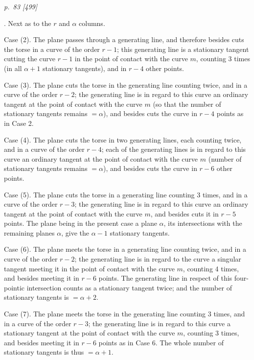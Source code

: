 \documentclass[11pt,a4paper]{article}
\newcommand{\pagemarker}[2]{\clearpage\noindent\textit{p.~#1 [#2]}\par\medskip}
\begin{document}
\pagemarker{83}{499}
21. Next as to the \(r\) and \(\alpha\) columns.

Case (2). The plane passes through a generating line, and therefore besides cuts the
torse in a curve of the order \(r-1\); this generating line is a stationary tangent
cutting the curve \(r-1\) in the point of contact with the curve \(m\), counting 3 times
(in all \(\alpha+1\) stationary tangents), and in \(r-4\) other points.

Case (3). The plane cuts the torse in the generating line counting twice, and in a
curve of the order \(r-2\); the generating line is in regard to this curve an ordinary
tangent at the point of contact with the curve \(m\) (so that the number of stationary
tangents remains \(=\alpha\)), and besides cuts the curve in \(r-4\) points as in Case 2.

Case (4). The plane cuts the torse in two generating lines, each counting twice, and
in a curve of the order \(r-4\); each of the generating lines is in regard to this curve
an ordinary tangent at the point of contact with the curve \(m\) (number of stationary
tangents remains \(=\alpha\)), and besides cuts the curve in \(r-6\) other points.

Case (5). The plane cuts the torse in a generating line counting 3 times, and in a
curve of the order \(r-3\); the generating line is in regard to this curve an ordinary
tangent at the point of contact with the curve \(m\), and besides cuts it in \(r-5\)
points. The plane being in the present case a plane \(\alpha\), its intersections with the
remaining planes \(\alpha\), give the \(\alpha-1\) stationary tangents.

Case (6). The plane meets the torse in a generating line counting twice, and in a
curve of the order \(r-2\); the generating line is in regard to the curve a singular
tangent meeting it in the point of contact with the curve \(m\), counting 4 times, and
besides meeting it in \(r-6\) points. The generating line in respect of this four-pointic
intersection counts as a stationary tangent twice; and the number of stationary
tangents is \(=\alpha+2\).

Case (7). The plane meets the torse in the generating line counting 3 times, and in
a curve of the order \(r-3\); the generating line is in regard to this curve a stationary
tangent at the point of contact with the curve \(m\), counting 3 times, and besides
meeting it in \(r-6\) points as in Case 6. The whole number of stationary tangents is
thus \(=\alpha+1\).
\end{document}

